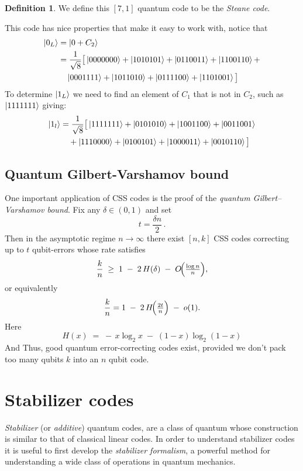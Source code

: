 \documentclass[11pt,a4paper]{article}
\theoremstyle{definition}
\newtheorem{definition}{Definition}[section]
\theoremstyle{plain}
\theoremstyle{remark}
\begin{document}
\begin{definition}
    We define this $[7,1]$ quantum code to be the \emph{Steane code}.
\end{definition}

This code has nice properties that make it easy to work with, notice that 
\begin{align}
    \ket{0_L} &= \ket{0 + C_2} \\
    &= \frac{1}{\sqrt{8}} \big[
        \ket{0000000} + \ket{1010101} + \ket{0110011} + 
        \ket{1100110} + \\
        &\quad \ket{0001111} + \ket{1011010} + 
        \ket{0111100} + \ket{1101001}
    \big] 
\end{align}
To determine $\ket{1_L}$ we need to find an element of $C_1$ that is not in $C_2$, such as $\ket{1111111}$ giving: 
\begin{align}
    \ket{1_l} &= \frac{1}{\sqrt{8}} \big[ 
        \ket{1111111} + \ket{0101010} + \ket{1001100} + 
        \ket{0011001} \\
        &\quad + \ket{1110000} + \ket{0100101} + \ket{1000011} + \ket{0010110} 
    \big]
\end{align}

\subsection{Quantum Gilbert-Varshamov bound} 
One important application of CSS codes is the proof of the \emph{quantum Gilbert–Varshamov bound}.  Fix any \(\delta\in(0,1)\) and set 
\[
t = \frac{\delta n}{2}\,.
\]
Then in the asymptotic regime \(n\to\infty\) there exist \([n,k]\) CSS codes correcting up to \(t\) qubit-errors whose rate satisfies
\[
\frac{k}{n}
\;\ge\;
1 \;-\; 2\,H(\delta)
\;-\;
O\!\Bigl(\tfrac{\log n}{n}\Bigr),
\]
or equivalently
\[
\frac{k}{n}
=
1 \;-\; 2\,H\!\Bigl(\tfrac{2t}{n}\Bigr)
\;-\;
o(1).
\]
Here 
\[
H(x) \;=\; -\,x\log_{2}x \;-\;(1-x)\log_{2}(1-x)
\] 
And Thus, good quantum error-correcting codes exist, provided we don't pack too many qubits $k$ into an $n$ qubit code. 

\section{Stabilizer codes} 
\emph{Stabilizer} (or \emph{additive}) quantum codes, are a class of quantum whose construction is similar to that of classical 
linear codes. In order to understand stabilizer codes it is useful to first develop the \emph{stabilizer formalism}, 
a powerful method for understanding a wide class of operations in quantum mechanics. 
\end{document}
